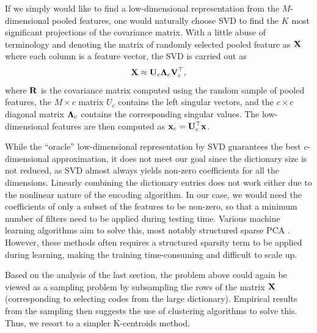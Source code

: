 If we simply would like to find a low-dimensional representation from the $M$-dimensional pooled features, one would naturally choose SVD to find the $K$ most significant projections of the covariance matrix. With a little abuse of terminology and denoting the matrix of randomly selected pooled feature as $\mathbf{X}$ where each column is a feature vector, the SVD is carried out as
\begin{equation}
    \mathbf{X} \approx \mathbf{U}_c\boldsymbol{\Lambda}_c\mathbf{V}_c^\top,
\end{equation}
where $\mathbf{R}$ is the covariance matrix computed using the random sample of pooled features, the $M\times c$ matrix $U_c$ contains the left singular vectors, and the $c\times c$ diagonal matrix $\boldsymbol{\Lambda}_c$ contains the corresponding singular values. The low-dimensional features are then computed as $\mathbf{x}_c = \mathbf{U}_c^\top\mathbf{x}$.

While the ``oracle'' low-dimensional representation by SVD guarantees the best $c$-dimensional approximation, it does not meet our goal since the dictionary size is not reduced, as SVD almost always yields non-zero coefficients for all the dimensions. Linearly combining the dictionary entries does not work either due to the nonlinear nature of the encoding algorithm. In our case, we would need the coefficients of only a subset of the features to be non-zero, so that a minimum number of filters need to be applied during testing time. Various machine learning algorithms aim to solve this, most notably structured sparse PCA \cite{jenatton2010structured}. However, these methods often requires a structured sparsity term to be applied during learning, making the training time-consuming and difficult to scale up.

Based on the analysis of the last section, the problem above could again be viewed as a \nystrom sampling problem by subsampling the rows of the matrix $\mathbf{X}$ (corresponding to selecting codes from the large dictionary). Empirical results from the \nystrom sampling then suggests the use of clustering algorithms to solve this. Thus, we resort to a simpler K-centroids method.

